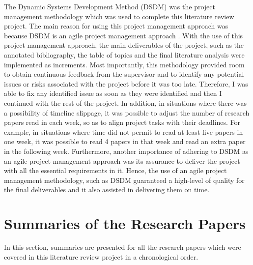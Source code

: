 \documentclass[]{article}
\begin{document}
The Dynamic Systems Development Method (DSDM) was the project management methodology which was used to complete this literature review project. The main reason for using this project management approach was because DSDM is an agile project management approach \cite{agile}. With the use of this project management approach, the main deliverables of the project, such as the annotated bibliography, the table of topics and the final literature analysis were implemented as increments. Most importantly, this methodology provided room to obtain continuous feedback from the supervisor and to identify any potential issues or risks associated with the project before it was too late. Therefore, I was able to fix any identified issue as soon as they were identified and then I continued with the rest of the project. In addition, in situations where there was a possibility of timeline slippage, it was possible to adjust the number of research papers read in each week, so as to align project tasks with their deadlines. For example, in situations where time did not permit to read at least five papers in one week, it was possible to read 4 papers in that week and read an extra paper in the following week. Furthermore, another importance of adhering to DSDM as an agile project management approach was its assurance to deliver the project with all the essential requirements in it. Hence, the use of an agile project management methodology, such as DSDM guaranteed a high-level of quality for the final deliverables and it also assisted in delivering them on time. 

\section{Summaries of the Research Papers} 

In this section, summaries are presented for all the research papers which were covered in this literature review project in a chronological order. 

\vspace{0.5cm}
\end{document}
